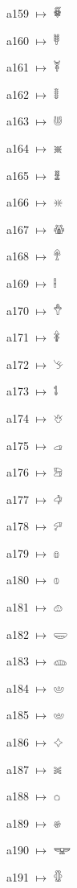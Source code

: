 {\noindent a159 $\mapsto$ {\ahfont 𔒺}\par
\noindent a160 $\mapsto$ {\ahfont 𔒻}\par
\noindent a161 $\mapsto$ {\ahfont 𔒼}\par
\noindent a162 $\mapsto$ {\ahfont 𔒽}\par
\noindent a163 $\mapsto$ {\ahfont 𔒾}\par
\noindent a164 $\mapsto$ {\ahfont 𔒿}\par
\noindent a165 $\mapsto$ {\ahfont 𔓀}\par
\noindent a166 $\mapsto$ {\ahfont 𔓁}\par
\noindent a167 $\mapsto$ {\ahfont 𔓂}\par
\noindent a168 $\mapsto$ {\ahfont 𔓃}\par
\noindent a169 $\mapsto$ {\ahfont 𔓄}\par
\noindent a170 $\mapsto$ {\ahfont 𔓅}\par
\noindent a171 $\mapsto$ {\ahfont 𔓆}\par
\noindent a172 $\mapsto$ {\ahfont 𔓇}\par
\noindent a173 $\mapsto$ {\ahfont 𔓈}\par
\noindent a174 $\mapsto$ {\ahfont 𔓉}\par
\noindent a175 $\mapsto$ {\ahfont 𔓊}\par
\noindent a176 $\mapsto$ {\ahfont 𔓋}\par
\noindent a177 $\mapsto$ {\ahfont 𔓌}\par
\noindent a178 $\mapsto$ {\ahfont 𔓍}\par
\noindent a179 $\mapsto$ {\ahfont 𔓎}\par
\noindent a180 $\mapsto$ {\ahfont 𔓏}\par
\noindent a181 $\mapsto$ {\ahfont 𔓐}\par
\noindent a182 $\mapsto$ {\ahfont 𔓑}\par
\noindent a183 $\mapsto$ {\ahfont 𔓒}\par
\noindent a184 $\mapsto$ {\ahfont 𔓓}\par
\noindent a185 $\mapsto$ {\ahfont 𔓔}\par
\noindent a186 $\mapsto$ {\ahfont 𔓕}\par
\noindent a187 $\mapsto$ {\ahfont 𔓖}\par
\noindent a188 $\mapsto$ {\ahfont 𔓗}\par
\noindent a189 $\mapsto$ {\ahfont 𔓘}\par
\noindent a190 $\mapsto$ {\ahfont 𔓙}\par
\noindent a191 $\mapsto$ {\ahfont 𔓚}\par
}
